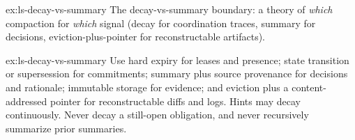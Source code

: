 \documentclass[11pt,a4paper]{article}
\theoremstyle{definition}
\theoremstyle{plain}
\begin{document}
\begin{pdexercise}[kind=Open,rating=3]{ex:ls-decay-vs-summary}
The
decay-vs-summary boundary: a theory of \emph{which} compaction for \emph{which}
signal (decay for coordination traces, summary for decisions,
eviction-plus-pointer for reconstructable artifacts).
\end{pdexercise}
\begin{pdsolution}{ex:ls-decay-vs-summary}
Use hard expiry for leases and presence; state transition or supersession for commitments; summary plus source provenance for decisions and rationale; immutable storage for evidence; and eviction plus a content-addressed pointer for reconstructable diffs and logs. Hints may decay continuously. Never decay a still-open obligation, and never recursively summarize prior summaries.
\end{pdsolution}

\end{document}
